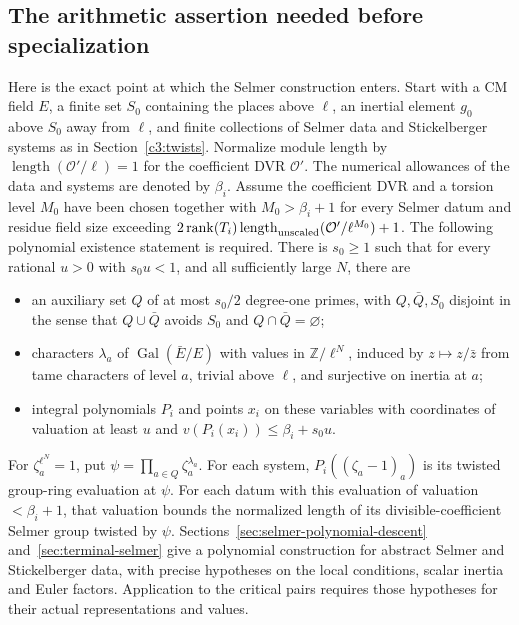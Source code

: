 \subsection{The arithmetic assertion needed before specialization}
\label{c4:twist-polynomials}
Here is the exact point at which the Selmer construction enters.
Start with a CM field \(E\), a finite set \(S_0\) containing the places
above \(\ell\), an inertial element \(g_0\) above \(S_0\) away from
\(\ell\), and finite collections of Selmer data and Stickelberger
systems as in Section~\ref{c3:twists}. Normalize module length by
\(\operatorname{length}(\mathcal O'/\ell)=1\) for the coefficient
DVR \(\mathcal O'\). The numerical allowances of the data and systems
are denoted by \(\beta_i\). Assume the coefficient DVR and a torsion level \(M_0\) have been chosen together with
\(M_0>\beta_i+1\) for every Selmer datum and residue field size
exceeding \(2\operatorname{rank}(T_i)
\operatorname{length}_{\rm unscaled}(\mathcal O'/\ell^{M_0})+1\).
The following polynomial existence statement is required.
There is \(s_0\ge1\) such that for every rational \(u>0\) with
\(s_0u<1\), and all sufficiently large \(N\), there are
\begin{itemize}
\item an auxiliary set \(Q\) of at most \(s_0/2\) degree-one primes, with
\(Q,\bar Q,S_0\) disjoint in the sense that \(Q\cup\bar Q\) avoids
\(S_0\) and \(Q\cap\bar Q=\varnothing\);
\item characters \(\lambda_a\) of \(\operatorname{Gal}(\bar E/E)\)
with values in \(\mathbb Z/\ell^N\), induced by
\(z\mapsto z/\bar z\) from tame characters of level \(a\), trivial
above \(\ell\), and surjective on inertia at \(a\);
\item integral polynomials \(P_i\) and points \(x_i\) on these
variables with coordinates of valuation at least \(u\) and
\(v(P_i(x_i))\le\beta_i+s_0u\).
\end{itemize}
For \(\zeta_a^{\ell^N}=1\), put
\(\psi=\prod_{a\in Q}\zeta_a^{\lambda_a}\).
For each system, \(P_i((\zeta_a-1)_a)\) is its twisted
group-ring evaluation at \(\psi\). For each datum with this evaluation
of valuation \(<\beta_i+1\), that valuation bounds the normalized
length of its divisible-coefficient Selmer group twisted by \(\psi\).
Sections~\ref{sec:selmer-polynomial-descent} and~\ref{sec:terminal-selmer} give a polynomial construction for abstract Selmer and Stickelberger data, with precise hypotheses on the local conditions, scalar inertia and Euler factors. Application to the critical pairs requires those hypotheses for their actual representations and values.

